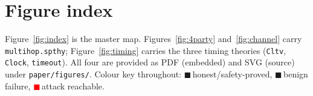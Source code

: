 \documentclass[11pt]{article}
\newcommand{\gc}{\textcolor{okgreen}{$\blacksquare$}}
\newcommand{\ac}{\textcolor{amber}{$\blacksquare$}}
\newcommand{\rc}{\textcolor{red}{$\blacksquare$}}
\begin{document}
\appendix
\section{Figure index}
Figure~\ref{fig:index} is the master map. Figures~\ref{fig:4party}
and~\ref{fig:channel} carry \texttt{multihop.spthy}; Figure~\ref{fig:timing}
carries the three timing theories (\texttt{Cltv}, \texttt{Clock},
\texttt{timeout}). All four are provided as PDF (embedded) and
SVG (source) under \texttt{paper/figures/}. Colour key throughout:
\gc\,honest/safety-proved, \ac\,benign failure, \rc\,attack reachable.
\end{document}
